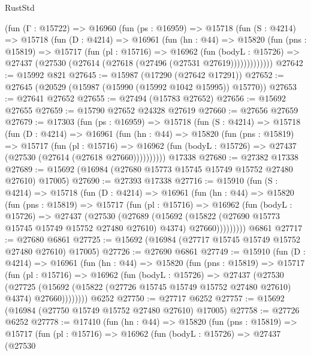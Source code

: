 \begin{lexlean}{RustStd}
\begin{coremodule}
    (fun (Γ : @15722) =>
    @16960
      (fun (ps : @16959) =>
      @15718
        (fun (S : @4214) =>
        @15718
          (fun (D : @4214) =>
          @16961
            (fun (hn : @44) =>
            @15820
              (fun (pns : @15819) =>
              @15717
                (fun (pl : @15716) =>
                @16962
                  (fun (bodyL : @15726) =>
                  @27437 (@27530 (@27614 (@27618 (@27496 (@27531 @27619)))))))))))))
@27642 := @15992 @821
@27645 := @15987 (@17290 (@27642 @17291))
@27652 := @27645 (@20529 (@15987 (@15990 (@15992 @1042 @15995)) @15770))
@27653 := @27641 @27652
@27655 := @27494 (@15783 @27652)
@27656 := @15692 @27655
@27659 := @15790 @27652 @24328 @27619
@27660 := @27656 @27659
@27679 := @17303
    (fun (ps : @16959) =>
    @15718
      (fun (S : @4214) =>
      @15718
        (fun (D : @4214) =>
        @16961
          (fun (hn : @44) =>
          @15820
            (fun (pns : @15819) =>
            @15717
              (fun (pl : @15716) =>
              @16962 (fun (bodyL : @15726) => @27437 (@27530 (@27614 (@27618 @27660))))))))))
    @17338
@27680 := @27382 @17338
@27689 := @15692 (@16984 (@27680 @15773 @15745 @15749 @15752 @27480 @27610) @17005)
@27690 := @27393 @17338
@27716 := @15910
    (fun (S : @4214) =>
    @15718
      (fun (D : @4214) =>
      @16961
        (fun (hn : @44) =>
        @15820
          (fun (pns : @15819) =>
          @15717
            (fun (pl : @15716) =>
            @16962
              (fun (bodyL : @15726) =>
              @27437
                (@27530
                  (@27689
                    (@15692
                      (@15822 (@27690 @15773 @15745 @15749 @15752 @27480 @27610) @4374)
                      @27660)))))))))
    @6861
@27717 := @27680 @6861
@27725 := @15692 (@16984 (@27717 @15745 @15749 @15752 @27480 @27610) @17005)
@27726 := @27690 @6861
@27749 := @15910
    (fun (D : @4214) =>
    @16961
      (fun (hn : @44) =>
      @15820
        (fun (pns : @15819) =>
        @15717
          (fun (pl : @15716) =>
          @16962
            (fun (bodyL : @15726) =>
            @27437
              (@27530
                (@27725
                  (@15692 (@15822 (@27726 @15745 @15749 @15752 @27480 @27610) @4374) @27660))))))))
    @6252
@27750 := @27717 @6252
@27757 := @15692 (@16984 (@27750 @15749 @15752 @27480 @27610) @17005)
@27758 := @27726 @6252
@27778 := @17410
    (fun (hn : @44) =>
    @15820
      (fun (pns : @15819) =>
      @15717
        (fun (pl : @15716) =>
        @16962
          (fun (bodyL : @15726) =>
          @27437
            (@27530

\end{coremodule}
\end{lexlean}
